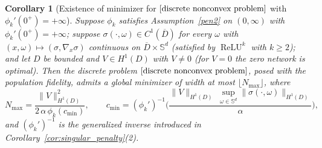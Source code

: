 \documentclass[11pt]{amsart}
\newtheorem{corollary}[theorem]{Corollary}
\theoremstyle{definition}
\theoremstyle{remark}
\DeclareMathOperator{\relu}{ReLU}
\newcommand{\reluk}{\relu^{k}}
\begin{document}
\begin{corollary}[Existence of minimizer for $\eqref{discrete nonconvex problem}$ with $\phi_k'(0^+) = +\infty$]
\label{cor:discrete_existence}
Suppose $\phi_k$ satisfies Assumption~\ref{pen2} on $(0, \infty)$ with $\phi_k'(0^+) = +\infty$;
suppose $\sigma(\cdot, \omega) \in C^1(\overline{D})$ for every $\omega$ with $(x, \omega) \mapsto (\sigma, \nabla_x \sigma)$ continuous on $\overline{D} \times \mathbb{S}^d$ (satisfied by $\reluk$ with $k \ge 2$); and let $D$ be bounded and $V \in H^1(D)$ with $V \neq 0$ (for $V = 0$ the
zero network is optimal).
Then the discrete problem $\eqref{discrete nonconvex problem}$, posed with the
population fidelity, admits a global minimizer of width at most
$\lfloor N_{\max} \rfloor$, where
\begin{equation*}
	N_{\max} = \frac{\|V\|_{H^1(D)}^2}{2\,\alpha\,\phi_k(c_{\min})}, \qquad
	c_{\min} = (\phi_k')^{-1}\!\bigg(\frac{\|V\|_{H^1(D)}\;\sup_{\omega \in \mathbb{S}^d}\|\sigma(\cdot, \omega)\|_{H^1(D)}}{\alpha}\bigg),
\end{equation*}
and $(\phi_k')^{-1}$ is the generalized inverse introduced in Corollary~\ref{cor:singular_penalty}(2).
\end{corollary}
\end{document}
